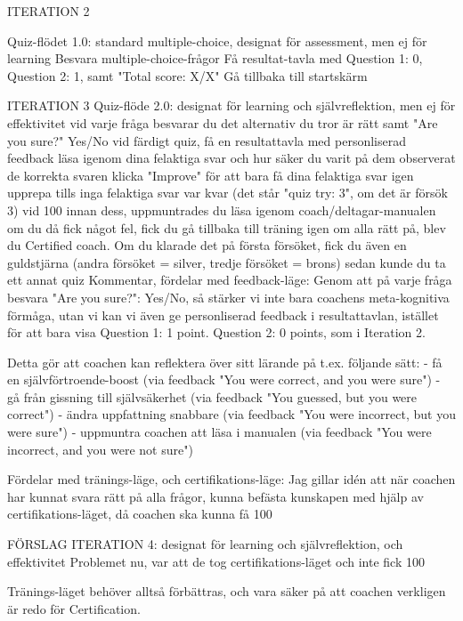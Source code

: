 ITERATION 2

Quiz-flödet 1.0: standard multiple-choice, designat för assessment, men ej för learning
Besvara multiple-choice-frågor
Få resultat-tavla med Question 1: 0, Question 2: 1, samt "Total score: X/X"
Gå tillbaka till startskärm


ITERATION 3
Quiz-flöde 2.0: designat för learning och självreflektion, men ej för effektivitet
vid varje fråga besvarar du det alternativ du tror är rätt samt "Are you sure?" Yes/No
vid färdigt quiz, få en resultattavla med personliserad feedback
läsa igenom dina felaktiga svar och hur säker du varit på dem
observerat de korrekta svaren
klicka "Improve" för att bara få dina felaktiga svar igen
upprepa tills inga felaktiga svar var kvar (det står "quiz try: 3", om det är försök 3)
vid 100%
innan dess, uppmuntrades du läsa igenom coach/deltagar-manualen
om du då fick något fel, fick du gå tillbaka till träning igen
om alla rätt på, blev du Certified coach. Om du klarade det på första försöket, fick du även en guldstjärna (andra försöket = silver, tredje försöket = brons)
sedan kunde du ta ett annat quiz
Kommentar, fördelar med feedback-läge:
Genom att på varje fråga besvara "Are you sure?": Yes/No, så stärker vi inte bara coachens meta-kognitiva förmåga, utan vi kan vi även ge personliserad feedback i resultattavlan, istället för att bara visa Question 1: 1 point. Question 2: 0 points, som i Iteration 2.

Detta gör att coachen kan reflektera över sitt lärande på t.ex. följande sätt:
- få en självförtroende-boost (via feedback "You were correct, and you were sure")
- gå från gissning till självsäkerhet (via feedback "You guessed, but you were correct")
- ändra uppfattning snabbare (via feedback "You were incorrect, but you were sure")
- uppmuntra coachen att läsa i manualen (via feedback "You were incorrect, and you were not sure")

Fördelar med tränings-läge, och certifikations-läge:
Jag gillar idén att när coachen har kunnat svara rätt på alla frågor, kunna befästa kunskapen med hjälp av certifikations-läget, då coachen ska kunna få 100%

FÖRSLAG ITERATION 4: designat för learning och självreflektion, och effektivitet
Problemet nu, var att de tog certifikations-läget och inte fick 100%

Tränings-läget behöver alltså förbättras, och vara säker på att coachen verkligen är redo för Certification.

